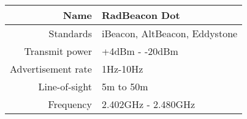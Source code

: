 \begin{tabular}{r|l}
Name	             & RadBeacon Dot                 \\ \hline
Standards          & iBeacon, AltBeacon, Eddystone \\ \hline
Transmit power     & +4dBm - -20dBm                \\ \hline
Advertisement rate & 1Hz-10Hz                      \\ \hline
Line-of-sight			 & 5m to 50m										 \\ \hline
Frequency	 				 & 2.402GHz - 2.480GHz						 \\ 
\end{tabular}
